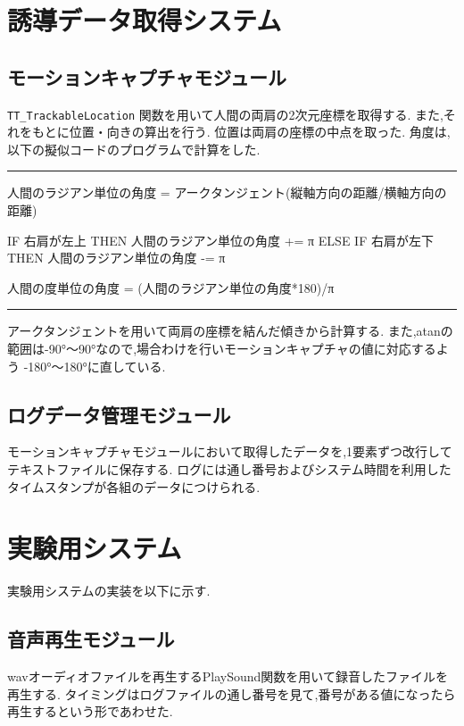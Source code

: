 \section{誘導データ取得システム}


\subsection{モーションキャプチャモジュール}
\verb|TT_TrackableLocation| 関数を用いて人間の両肩の2次元座標を取得する.
また,それをもとに位置・向きの算出を行う.
位置は両肩の座標の中点を取った.
角度は,以下の擬似コードのプログラムで計算をした.


\vspace{4zh} 
\hrule width 15cm
\begin{verbatimtab}
人間のラジアン単位の角度 = アークタンジェント(縦軸方向の距離/横軸方向の距離)

IF 右肩が左上 THEN
	人間のラジアン単位の角度 += π
ELSE IF 右肩が左下 THEN
	人間のラジアン単位の角度 -= π
	
人間の度単位の角度 = (人間のラジアン単位の角度*180)/π
\end{verbatimtab}
\hrule width 15cm
\vspace{4zh} 

アークタンジェントを用いて両肩の座標を結んだ傾きから計算する.
また,atanの範囲は-90°～90°なので,場合わけを行いモーションキャプチャの値に対応するよう
-180°～180°に直している.


\subsection{ログデータ管理モジュール}
モーションキャプチャモジュールにおいて取得したデータを,1要素ずつ改行してテキストファイルに保存する.
ログには通し番号およびシステム時間を利用したタイムスタンプが各組のデータにつけられる.


\section{実験用システム}
実験用システムの実装を以下に示す.



\subsection{音声再生モジュール}
wavオーディオファイルを再生するPlaySound関数を用いて録音したファイルを再生する.
タイミングはログファイルの通し番号を見て,番号がある値になったら再生するという形であわせた.


